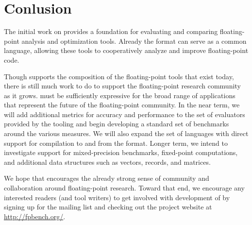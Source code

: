 \documentclass[main.tex]{subfiles}
\begin{document}
\section{Conlusion}
\label{sec:conclusion}

The initial work on \name provides a
foundation for evaluating and comparing floating-point analysis and
optimization tools.  Already the \name format can serve as a
common language, allowing these tools to
cooperatively analyze and improve floating-point code.

Though \name supports the composition
  of the floating-point tools that exist today,
  there is still much work to do to support
  the floating-point research community as it grows.
\name must be sufficiently expressive for the broad range of applications
  that represent the future of the floating-point community.
In the near term, we will add additional
metrics for accuracy and performance to the set of evaluators provided by
the \name tooling and begin developing a standard set of benchmarks
around the various measures. We will also expand the set of languages with
direct support for compilation to and from the \name format. Longer
term, we intend to investigate support for mixed-precision benchmarks,
fixed-point computations, and additional data structures such as
vectors, records, and matrices.

We hope that \name encourages the already strong sense of community
and collaboration around floating-point research.  Toward that end, we
encourage any interested readers (and tool writers)
to get involved with development of \name
by signing up for the mailing list and checking out the project
website at \url{http://fpbench.org/}.
\end{document}
